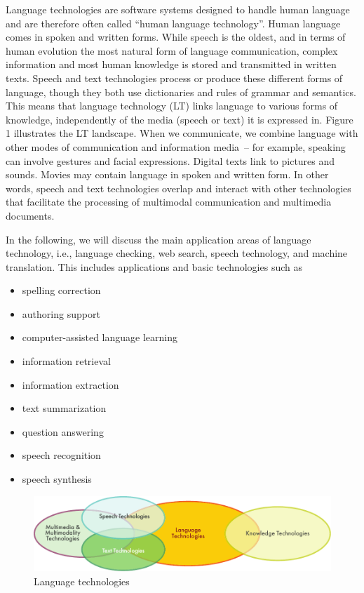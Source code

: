 \clearpage


\begin{multicols}{2}

Language technologies are software systems designed to handle human language and are therefore often called ``human language technology''.
Human language comes in spoken and written forms.
While speech is the oldest, and in terms of human evolution the most natural form of language communication, complex information and most human knowledge is stored and transmitted in written texts.
Speech and text technologies process or produce these different forms of language, though they both use dictionaries and rules of grammar and semantics.
This means that language technology (LT) links language to various forms of knowledge, independently of the media (speech or text) it is expressed in.
Figure 1 illustrates the LT landscape.
When we communicate, we combine language with other modes of communication and information media~-- for example, speaking can involve gestures and facial expressions.
Digital texts link to pictures and sounds.
Movies may contain language in spoken and written form.
In other words, speech and text technologies overlap and interact with other technologies that facilitate the processing of multimodal communication and multimedia documents.

In the following, we will discuss the main application areas of language technology, i.e., language checking, web search, speech technology, and machine translation.
This includes applications and basic technologies such as 
\begin{itemize}
\item  spelling correction
\item  authoring support
\item  computer-assisted language learning
\item  information retrieval 
\item  information extraction
\item  text summarization
\item  question answering
\item  speech recognition 
\item  speech synthesis 
\end{itemize}

\begin{figure}[htb]
  \center
  \includegraphics[width=\textwidth]{../_media/english/language_technologies}
  \caption{Language technologies}
  \label{fig:ltincontext_en}
\end{figure}


\end{multicols}
